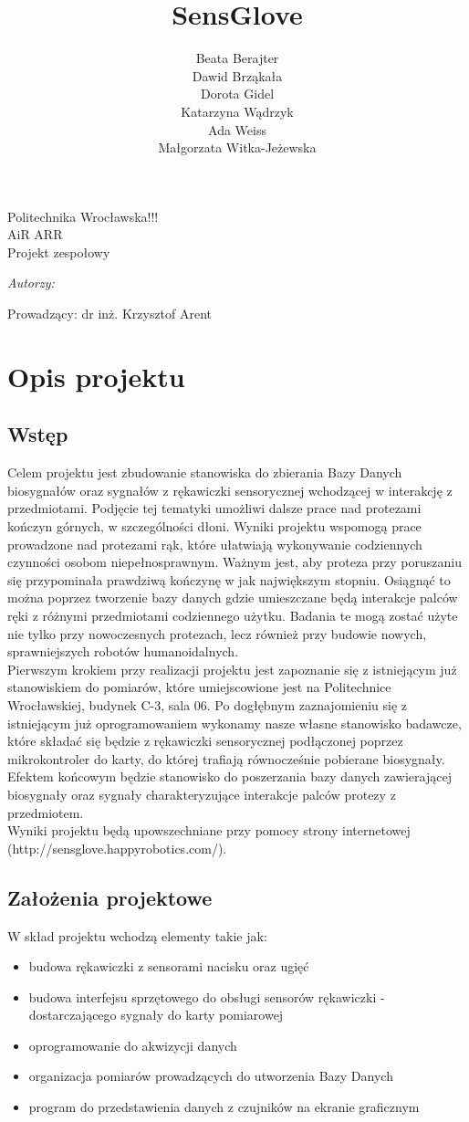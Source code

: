\documentclass{article}
\author{Beata Berajter\\
Dawid Brząkała\\
Dorota Gidel\\
Katarzyna Wądrzyk\\
Ada Weiss\\
Małgorzata Witka-Jeżewska\\
 }%
\title{SensGlove}
\makeatletter
\renewcommand{\maketitle}{\begin{titlepage}
    \vspace*{1cm}
    \begin{center}
    Politechnika Wrocławska!!!\\
    AiR ARR\\
 Projekt zespołowy
    \end{center}
      \vspace{3cm}
    \begin{center}

     \LARGE \textsc {\@title}
         \end{center}
     \vspace{1cm}

    \begin{center}
    \textit{ Autorzy:}\\
   \textit{\@author}
     \end{center}
      \vspace{1cm}

     \begin{center}

    Prowadzący:
  dr inż. Krzysztof Arent %
    \end{center}

    \vspace*{\stretch{6}}
    \begin{center}
    \@date
    \end{center}
  \end{titlepage}
}
\makeatother
\begin{document}
\maketitle
\newpage
\tableofcontents
\newpage
\section{Opis projektu}
\subsection{Wstęp}
Celem projektu jest zbudowanie stanowiska do zbierania Bazy Danych biosygnałów oraz sygnałów z rękawiczki sensorycznej wchodzącej w interakcję z przedmiotami. Podjęcie tej tematyki umożliwi dalsze prace nad protezami kończyn górnych, w szczególności dłoni. Wyniki projektu wspomogą prace prowadzone nad protezami rąk, które ułatwiają wykonywanie codziennych czynności osobom niepełnosprawnym. Ważnym jest, aby proteza przy poruszaniu się przypominała prawdziwą kończynę w jak największym stopniu. Osiągnąć to można poprzez tworzenie bazy danych gdzie umieszczane będą interakcje palców ręki z różnymi przedmiotami codziennego użytku.
Badania te mogą zostać użyte nie tylko przy nowoczesnych protezach, lecz również przy budowie nowych, sprawniejszych robotów humanoidalnych.\\
Pierwszym krokiem przy realizacji projektu jest zapoznanie się z istniejącym już stanowiskiem do pomiarów, które umiejscowione jest na Politechnice Wrocławskiej, budynek C-3, sala 06. Po dogłębnym zaznajomieniu się z istniejącym już oprogramowaniem wykonamy nasze własne stanowisko badawcze, które składać się będzie z rękawiczki sensorycznej podłączonej poprzez mikrokontroler do karty, do której trafiają równocześnie pobierane biosygnały.\\
Efektem końcowym będzie stanowisko do poszerzania bazy danych zawierającej biosygnały oraz sygnały charakteryzujące interakcje palców protezy z przedmiotem.\\
Wyniki projektu będą upowszechniane przy pomocy strony internetowej (http://sensglove.happyrobotics.com/).\\


\subsection{Założenia projektowe}
W skład projektu wchodzą elementy takie jak:
\begin{itemize}
\item budowa rękawiczki z sensorami nacisku oraz ugięć
\item budowa interfejsu sprzętowego do obsługi sensorów rękawiczki - dostarczającego sygnały do karty pomiarowej
\item oprogramowanie do akwizycji danych
\item organizacja pomiarów prowadzących do utworzenia Bazy Danych
\item program do przedstawienia danych z czujników na ekranie graficznym
\end{itemize}
\end{document}
